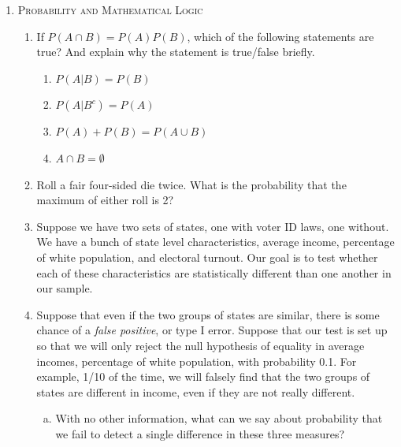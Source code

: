 \documentclass[10pt,letterpaper]{article}
\theoremstyle{definition}
\numberwithin{equation}{section}
\begin{document}
\pagebreak
\begin{enumerate}[I]
\item \textsc{Probability and Mathematical Logic }
\begin{enumerate}[1)]
\item If $P(A\cap B)=P(A)P(B)$, which of the following statements are true? And explain why the statement is true/false briefly.
\begin{enumerate}
\item[a)] $P(A|B)=P(B)$ 
\vfill

\item[b)] $P(A|B^c)=P(A)$ 
\vfill

\item[c)] $P(A)+P(B)=P(A\cup B)$ 
\vfill

\item[d)] $A\cap B=\emptyset$
\vfill

\end{enumerate}


\item Roll a fair four-sided die twice. What is the probability that the maximum of either roll is 2?
\vfill
\bigskip

\pagebreak

\item Suppose we have two sets of states, one with voter ID laws, one without.  We have a bunch of state level characteristics, average income, percentage of white population, and electoral turnout.  Our goal is to test whether each of these characteristics are statistically different than one another in our sample.
\bigskip
\item[] Suppose that even if the two groups of states are similar, there is some chance of a \emph{false positive}, or type I error.  Suppose that our test is set up so that we will only reject the null hypothesis of equality in average incomes, percentage of white population, with probability 0.1.  For example, 1/10 of the time, we will falsely find that the two groups of states are different in income, even if they are not really different.  
\begin{enumerate}[a)]
\item With no other information, what can we say about probability that we fail to detect a single difference in these three measures?
\vfill


\end{enumerate}
\end{enumerate}
\end{enumerate}
\end{document}
